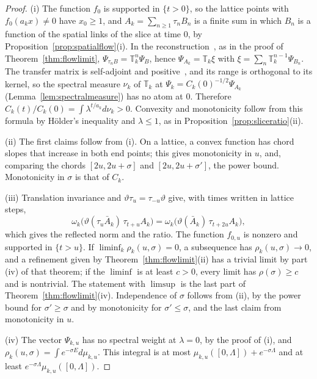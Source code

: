 \documentclass[aps,prd,twocolumn,superscriptaddress,nofootinbib,longbibliography,floatfix,amsmath,amssymb,10pt]{revtex4-2}
\theoremstyle{definition}
\theoremstyle{remark}
\begin{document}
\begin{proof}
(i) The function $f_0$ is supported in $\{t>0\}$, so the lattice points with
$f_0(a_kx)\ne0$ have $x_0\ge1$, and $A_k=\sum_{n\ge1}\tau_nB_n$ is a finite
sum in which $B_n$ is a function of the spatial links of the slice at time
$0$, by Proposition~\ref{prop:spatialflow}(i). In the reconstruction~\cite{OS73,OS75,OSei78}, as in the proof of
Theorem~\ref{thm:flowlimit}, $\Psi_{\tau_nB}=\mathbb T_k^n\Psi_B$, hence
$\Psi_{A_k}=\mathbb T_k\xi$ with $\xi=\sum_n\mathbb T_k^{n-1}\Psi_{B_n}$. The
transfer matrix is self-adjoint and positive~\cite{OSei78,Lus77,Sei82}, and
its range is orthogonal to its kernel,
so the spectral measure $\nu_k$ of $\mathbb T_k$ at
$\Psi_k=C_k(0)^{-1/2}\Psi_{A_k}$ (Lemma~\ref{lem:spectralmeasure}) has no atom
at $0$. Therefore $C_k(t)/C_k(0)=\int\lambda^{t/a_k}d\nu_k>0$. Convexity and
monotonicity follow from this formula by H\"older's inequality and $\lambda\le1$, as in Proposition~\ref{prop:sliceratio}(ii).

(ii) The first claims follow from (i). On a lattice, a convex function has
chord slopes that increase in both end points; this gives monotonicity in
$u$, and, comparing the chords $[2u,2u+\sigma]$ and $[2u,2u+\sigma']$, the
power bound. Monotonicity in $\sigma$ is that of $C_k$.

(iii) Translation invariance and $\vartheta\tau_u=\tau_{-u}\vartheta$ give,
with times written in lattice steps,
\[
\omega_k\bigl(\vartheta(\tau_u\bar A_k)\,\tau_{t+u}A_k\bigr)
=\omega_k\bigl(\vartheta(\bar A_k)\,\tau_{t+2u}A_k\bigr),
\]
which gives the reflected norm and the ratio. The function $f_{0,u}$ is nonzero and
supported in $\{t>u\}$. If $\liminf_k\rho_k(u,\sigma)=0$, a subsequence has
$\rho_k(u,\sigma)\to0$, and a refinement given by
Theorem~\ref{thm:flowlimit}(ii) has a trivial limit by part (iv) of that
theorem; if the $\liminf$ is at least $c>0$, every limit has $\rho(\sigma)\ge
c$ and is nontrivial. The statement with $\limsup$ is the last part of
Theorem~\ref{thm:flowlimit}(iv). Independence of $\sigma$ follows from (ii),
by the power bound for $\sigma'\ge\sigma$ and by monotonicity for
$\sigma'\le\sigma$, and the last claim from monotonicity in $u$.

(iv) The vector $\Psi_{k,u}$ has no spectral weight at $\lambda=0$, by the
proof of (i), and $\rho_k(u,\sigma)=\int e^{-\sigma E}d\mu_{k,u}$. This
integral is at most $\mu_{k,u}([0,\Lambda])+e^{-\sigma\Lambda}$ and at least
$e^{-\sigma\Lambda}\mu_{k,u}([0,\Lambda])$.
\end{proof}
\end{document}
